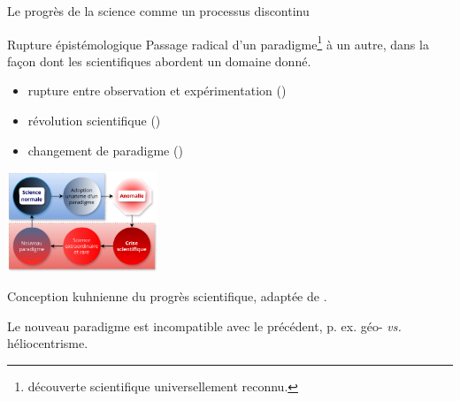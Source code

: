 \begin{frame}{Le progrès de la science comme un processus discontinu}
\begin{block}{Rupture épistémologique}
Passage radical d'un paradigme\footnote{découverte scientifique universellement reconnu.} à un autre, dans la façon dont les scientifiques abordent un domaine donné.
\end{block}
\begin{itemize}
\item \og{}rupture entre observation et expérimentation\fg{} 
{\footnotesize(\cite{bachelard1934formation})}
\item \og{}révolution scientifique\fg{} {\footnotesize(\cite{koyre1957closed})}
\item \og{}changement de paradigme\fg{} {\footnotesize(\cite{kuhn1962structure})} 
\end{itemize} 
\begin{minipage}{5cm}
\includegraphics[height=3cm, width=4.5cm]{pic/changement_paradigme.png}
\end{minipage}%
\begin{minipage}{6cm}
{\normaltext Conception kuhnienne du progrès scientifique, adaptée de {\scriptsize\textcite{amiri}}}. \bigskip

 {\scriptsize Le nouveau paradigme est incompatible avec le précédent, p. ex. géo- \textit{vs.} héliocentrisme.}
\end{minipage}
\end{frame}
